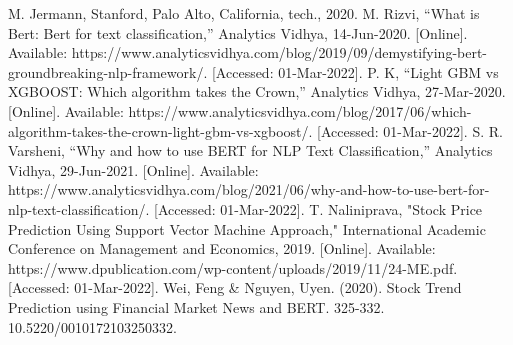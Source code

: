 \documentclass[conference]{IEEEtran}
\begin{document}
\begin{thebibliography}{00}
     M. Jermann, Stanford, Palo Alto, California, tech., 2020.
     M. Rizvi, “What is Bert: Bert for text classification,” Analytics Vidhya, 14-Jun-2020. [Online]. Available: https://www.analyticsvidhya.com/blog/2019/09/demystifying-bert-groundbreaking-nlp-framework/. [Accessed: 01-Mar-2022].
     P. K, “Light GBM vs XGBOOST: Which algorithm takes the Crown,” Analytics Vidhya, 27-Mar-2020. [Online]. Available: https://www.analyticsvidhya.com/blog/2017/06/which-algorithm-takes-the-crown-light-gbm-vs-xgboost/. [Accessed: 01-Mar-2022].
     S. R. Varsheni, “Why and how to use BERT for NLP Text Classification,” Analytics Vidhya, 29-Jun-2021. [Online]. Available: https://www.analyticsvidhya.com/blog/2021/06/why-and-how-to-use-bert-for-nlp-text-classification/. [Accessed: 01-Mar-2022].
     T. Naliniprava, "Stock Price Prediction Using Support Vector Machine Approach," International Academic Conference on Management and Economics, 2019. [Online]. Available: https://www.dpublication.com/wp-content/uploads/2019/11/24-ME.pdf. [Accessed: 01-Mar-2022].
     Wei, Feng \& Nguyen, Uyen. (2020). Stock Trend Prediction using Financial Market News and BERT. 325-332. 10.5220/0010172103250332.
\end{thebibliography}
\end{document}
